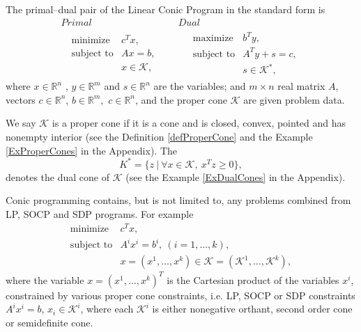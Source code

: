 \documentclass[12pt]{book}
\theoremstyle{definition}
\begin{document}
\label{defConeProg}
The primal--dual pair of the Linear Conic Program in the standard form is  
\begin{equation}
\label{coneProg} 
\begin{array}{cc}
Primal & Dual \\
\ \ \ \begin{array}{ll}
\mbox{minimize} & c^Tx,\\
\mbox{subject to}& Ax = b,\\
& x \in \mathcal{K},
\end{array} 
 \ \ \ \ \ & \ \ \ \ \ 
 \begin{array}{ll}
\mbox{maximize} & b^Ty,\\
\mbox{subject to}& A^Ty + s = c,\\
& s \in \mathcal{K}^*,
\end{array}
\end{array}
\tag{Conic Program}
\end{equation}
where $x\in \mathbb{R}^n$ , $y\in \mathbb{R}^m$ and $s\in \mathbb{R}^n$ are the variables; and $m\times n$ real matrix $A$, vectors $c\in \mathbb{R}^n$, $b\in \mathbb{R}^{m},$ $c\in \mathbb{R}^n$, and the proper cone $\mathcal{K}$ are given problem data. 

\rem
We say $\mathcal{K}$ is a proper cone if it is a cone and is closed, convex, pointed and has nonempty interior (see the Definition \ref{defProperCone} and the Example \ref{ExProperCones} in the Appendix). The 
\begin{equation}
{K}^* = \{z\ |\ \forall x\in\mathcal{K}, \ x^Tz\geq 0\},
\end{equation} 
denotes the dual cone of $\mathcal{K}$ (see the Example \ref{ExDualCones} in the Appendix).

Conic programming contains, but is not limited to, any problems combined from LP, SOCP and SDP programs. 
For example 
\begin{equation}
\begin{array}{ll}
\mbox{minimize} & c^Tx,\\
\mbox{subject to}&A^ix^i=b^i, \ (i = 1,\dots ,k),\\
& x=(x^1,\dots ,x^k) \in \mathcal{K} = (\mathcal{K}^1,\dots ,\mathcal{K}^k),
\end{array} 
\end{equation}
where the variable $x=(x^1, \dots, x^k)^T$ is the Cartesian product of the variables $x^i$, constrained by various proper cone constraints, i.e. LP, SOCP or SDP constraints 
$A^ix^i=b$, $x_i\in \mathcal{K}^i$, where each $\mathcal{K}^i$ is either nonegative orthant, second order cone or semidefinite cone.
\end{document}
